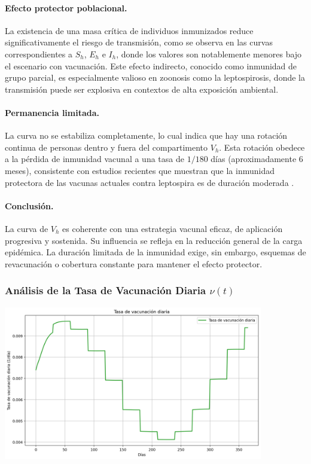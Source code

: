 \documentclass[12pt,a4paper]{article}
\begin{document}
\paragraph{Efecto protector poblacional.} La existencia de una masa crítica de individuos inmunizados reduce significativamente el riesgo de transmisión, como se observa en las curvas correspondientes a $S_h$, $E_h$ e $I_h$, donde los valores son notablemente menores bajo el escenario con vacunación. Este efecto indirecto, conocido como inmunidad de grupo parcial, es especialmente valioso en zoonosis como la leptospirosis, donde la transmisión puede ser explosiva en contextos de alta exposición ambiental.

\paragraph{Permanencia limitada.} La curva no se estabiliza completamente, lo cual indica que hay una rotación continua de personas dentro y fuera del compartimento $V_h$. Esta rotación obedece a la pérdida de inmunidad vacunal a una tasa de $1/180$ días (aproximadamente 6 meses), consistente con estudios recientes que muestran que la inmunidad protectora de las vacunas actuales contra leptospira es de duración moderada \cite{goris2020}.

\paragraph{Conclusión.} La curva de $V_h$ es coherente con una estrategia vacunal eficaz, de aplicación progresiva y sostenida. Su influencia se refleja en la reducción general de la carga epidémica. La duración limitada de la inmunidad exige, sin embargo, esquemas de revacunación o cobertura constante para mantener el efecto protector.

\subsubsection[Análisis de la Tasa de Vacunación Diaria nu(t)]{Análisis de la Tasa de Vacunación Diaria $\nu(t)$}

\includegraphics[width=0.85\textwidth]{Images/tasa_vacc.png}
\end{document}
